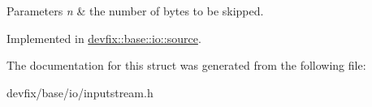 \begin{DoxyParams}{Parameters}
{\em n} & the number of bytes to be skipped. \\
\hline
\end{DoxyParams}


Implemented in \hyperlink{structdevfix_1_1base_1_1io_1_1source_a21cb579307589cbc6f9e02d64c66f4b2}{devfix\+::base\+::io\+::source}.



The documentation for this struct was generated from the following file\+:\begin{DoxyCompactItemize}
\item 
devfix/base/io/inputstream.\+h\end{DoxyCompactItemize}
